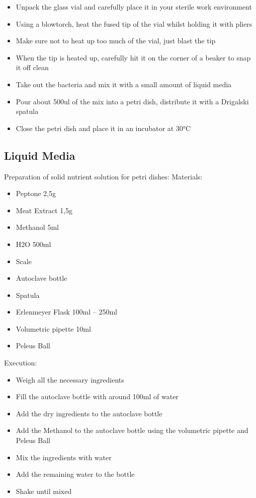\begin{itemize}
    \item Unpack the glass vial and carefully place it in your sterile work environment
    \item Using a blowtorch, heat the fused tip of the vial whilst holding it with pliers
    \item Make sure not to heat up too much of the vial, just blast the tip
    \item When the tip is heated up, carefully hit it on the corner of a beaker to snap it
    off clean
    \item Take out the bacteria and mix it with a small amount of liquid media
    \item Pour about 500ul of the mix into a petri dish, distribute it with a Drigalski
    spatula
    \item Close the petri dish and place it in an incubator at 30°C
\end{itemize}

\subsection{Liquid Media}
Preparation of solid nutrient solution for petri dishes:
Materials:

\begin{itemize}
    \item Peptone 2,5g
    \item Meat Extract 1,5g
    \item Methanol 5ml
    \item H2O 500ml
    \item Scale
    \item Autoclave bottle
    \item Spatula
    \item Erlenmeyer Flask 100ml – 250ml
    \item Volumetric pipette 10ml
    \item Peleus Ball
\end{itemize}


Execution:

\begin{itemize}

    \item Weigh all the necessary ingredients

    \item Fill the autoclave bottle with around 100ml of water
    \item Add the dry ingredients to the autoclave bottle
    \item Add the Methanol to the autoclave bottle using the volumetric pipette and
    Peleus Ball
    \item Mix the ingredients with water
    \item Add the remaining water to the bottle
    \item Shake until mixed
\end{itemize}

